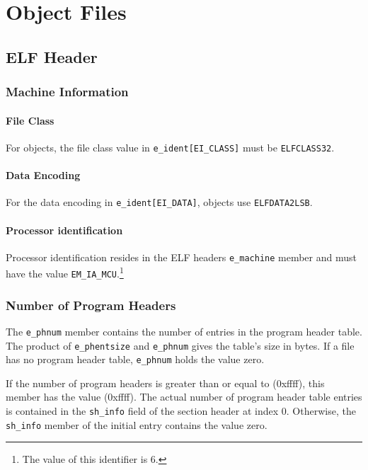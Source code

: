 
\chapter{Object Files}

\section{ELF Header}

\subsection{Machine Information}

\subsubsection{File Class}

For \xARCH objects, the file class value in \texttt{e_ident[EI_CLASS]}
must be \texttt{ELFCLASS32}.

\subsubsection{Data Encoding}

For the data encoding in \texttt{e_ident[EI_DATA]}, \xARCH objects use
\texttt{ELFDATA2LSB}.

\subsubsection{Processor identification}

Processor identification resides in the ELF headers
\texttt{e_machine} member and must have the value
\texttt{EM_IA_MCU}.\footnote{The value of this identifier is 6.}

\subsection{Number of Program Headers}

The \texttt{e_phnum} member contains the number of entries in the program
header table. The product of
\texttt{e_phentsize} and \texttt{e_phnum} gives the table's size in bytes.
If a file has no program header table, \texttt{e_phnum} holds the value zero.

If the number of program headers is greater than or equal to
 (0xffff), this member has the value  (0xffff).
The actual number of program header table entries is contained in
the \texttt{sh_info} field of the section header at index 0. Otherwise,
the \texttt{sh_info} member of the initial entry contains the value zero.

